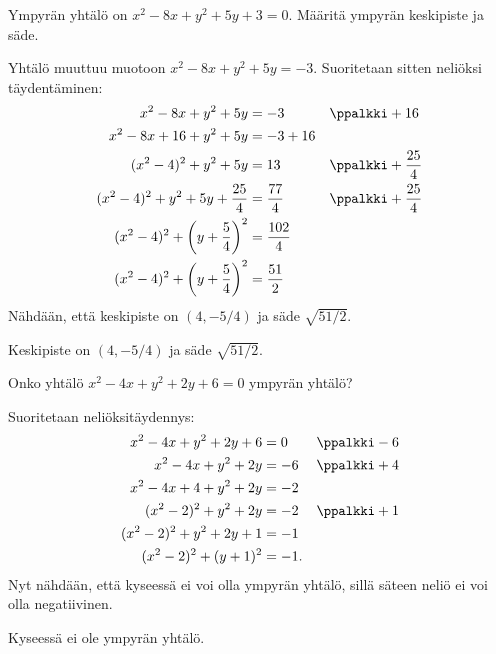 \begin{esimerkki}
Ympyrän yhtälö on $x^2-8x+y^2+5y+3=0$. Määritä ympyrän keskipiste ja säde.
\begin{esimratk}
Yhtälö muuttuu muotoon $x^2-8x+y^2+5y=-3$. Suoritetaan sitten neliöksi täydentäminen:
\begin{align*}
x^2-8x+y^2+5y&=-3 && \ppalkki +16\\
x^2-8x+16+y^2+5y&=-3+16 && \\
(x^2-4)^2+y^2+5y&=13 && \ppalkki +\frac{25}{4}\\
(x^2-4)^2+y^2+5y+\frac{25}{4}&=\frac{77}{4} && \ppalkki +\frac{25}{4}\\
(x^2-4)^2+\left(y+\frac{5}{4}\right)^2&=\frac{102}{4} && \\
(x^2-4)^2+\left(y+\frac{5}{4}\right)^2&=\frac{51}{2} && 
\end{align*}
Nähdään, että keskipiste on $(4, -5/4)$ ja säde $\sqrt{51/2}$.
\end{esimratk}
\begin{esimvast}
Keskipiste on $(4, -5/4)$ ja säde $\sqrt{51/2}$.
\end{esimvast}
\end{esimerkki}

\begin{esimerkki}
Onko yhtälö $x^2-4x+y^2+2y+6=0$ ympyrän yhtälö?
\begin{esimratk}
Suoritetaan neliöksitäydennys:
\begin{align*}
x^2-4x+y^2+2y+6&=0 && \ppalkki -6\\
x^2-4x+y^2+2y&=-6 && \ppalkki +4\\
x^2-4x+4+y^2+2y&=-2 && \\
(x^2-2)^2+y^2+2y&=-2 && \ppalkki +1\\
(x^2-2)^2+y^2+2y+1&=-1 && \\
(x^2-2)^2+(y+1)^2&=-1. &&
\end{align*}
Nyt nähdään, että kyseessä ei voi olla ympyrän yhtälö, sillä säteen neliö ei voi olla negatiivinen.
\end{esimratk}
\begin{esimvast}
Kyseessä ei ole ympyrän yhtälö.
\end{esimvast}
\end{esimerkki}

